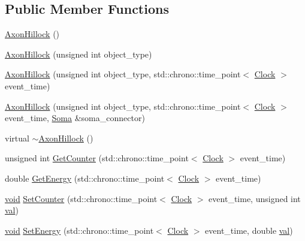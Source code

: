 \subsection*{Public Member Functions}
\begin{DoxyCompactItemize}
\item 
\mbox{\hyperlink{class_axon_hillock_a432095dfb25ece393cdd83b5eb4f097a}{Axon\+Hillock}} ()
\item 
\mbox{\hyperlink{class_axon_hillock_a20a4da0885f32bfca34ab5cda2a13562}{Axon\+Hillock}} (unsigned int object\+\_\+type)
\item 
\mbox{\hyperlink{class_axon_hillock_acc61c61c8dfddd603e868a2fcbfd5e9c}{Axon\+Hillock}} (unsigned int object\+\_\+type, std\+::chrono\+::time\+\_\+point$<$ \mbox{\hyperlink{universe_8h_a0ef8d951d1ca5ab3cfaf7ab4c7a6fd80}{Clock}} $>$ event\+\_\+time)
\item 
\mbox{\hyperlink{class_axon_hillock_a250945e24a51475369b6c7881c0d955b}{Axon\+Hillock}} (unsigned int object\+\_\+type, std\+::chrono\+::time\+\_\+point$<$ \mbox{\hyperlink{universe_8h_a0ef8d951d1ca5ab3cfaf7ab4c7a6fd80}{Clock}} $>$ event\+\_\+time, \mbox{\hyperlink{class_soma}{Soma}} \&soma\+\_\+connector)
\item 
virtual \mbox{\hyperlink{class_axon_hillock_ae86220026d7c87edc1c514521d66f992}{$\sim$\+Axon\+Hillock}} ()
\item 
unsigned int \mbox{\hyperlink{class_axon_hillock_a429c9876d679fe8de4533725afc4875c}{Get\+Counter}} (std\+::chrono\+::time\+\_\+point$<$ \mbox{\hyperlink{universe_8h_a0ef8d951d1ca5ab3cfaf7ab4c7a6fd80}{Clock}} $>$ event\+\_\+time)
\item 
double \mbox{\hyperlink{class_axon_hillock_ab5ac3ab8771b96acf7e3fa07152525a5}{Get\+Energy}} (std\+::chrono\+::time\+\_\+point$<$ \mbox{\hyperlink{universe_8h_a0ef8d951d1ca5ab3cfaf7ab4c7a6fd80}{Clock}} $>$ event\+\_\+time)
\item 
\mbox{\hyperlink{glad_8h_a950fc91edb4504f62f1c577bf4727c29}{void}} \mbox{\hyperlink{class_axon_hillock_a0220cee0ad99ddc48496982078c1856c}{Set\+Counter}} (std\+::chrono\+::time\+\_\+point$<$ \mbox{\hyperlink{universe_8h_a0ef8d951d1ca5ab3cfaf7ab4c7a6fd80}{Clock}} $>$ event\+\_\+time, unsigned int \mbox{\hyperlink{glad_8h_a26942fd2ed566ef553eae82d2c109c8f}{val}})
\item 
\mbox{\hyperlink{glad_8h_a950fc91edb4504f62f1c577bf4727c29}{void}} \mbox{\hyperlink{class_axon_hillock_a830afd18810e0eaa11a9e7a500b8f0c4}{Set\+Energy}} (std\+::chrono\+::time\+\_\+point$<$ \mbox{\hyperlink{universe_8h_a0ef8d951d1ca5ab3cfaf7ab4c7a6fd80}{Clock}} $>$ event\+\_\+time, double \mbox{\hyperlink{glad_8h_a26942fd2ed566ef553eae82d2c109c8f}{val}})

\end{DoxyCompactItemize}

